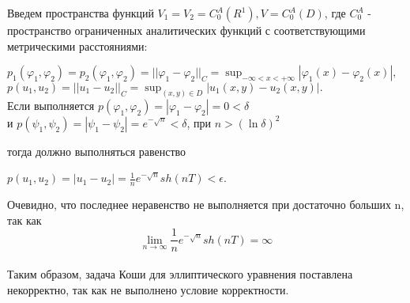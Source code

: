 \documentclass[../main.tex]{subfiles}
\begin{document}
Введем пространства функций $V_1=V_2=C_0^A(R^1), V=C_0^A(D)$, где $C_0^A$ - пространство ограниченных аналитических функций с соответствующими метрическими расстояниями:
\begin{center}
	$p_1(\varphi_1,\varphi_2)=p_2(\varphi_1, \varphi_2) =||\varphi_1-\varphi_2||_C = \sup_{-\infty<x<+\infty}|\varphi_1(x)-\varphi_2(x)|, $\\
	$ $\\
	$p(u_1, u_2)=||u_1-u_2||_C=\sup_{(x,y) \in D}|u_1(x,y)-u_2(x,y)|.$\\
	$ $\\
	Если выполняется $p(\varphi_1,\varphi_2)=|\varphi_1-\varphi_2|=0<\delta$\\
	$ $\\
	и $p(\psi_1,\psi_2)=|\psi_1-\psi_2|=e^{-\sqrt{n}}<\delta$, при $n>(\ln{\delta})^2$
\end{center}

тогда должно выполняться равенство

\begin{center}
	$p(u_1,u_2)=|u_1-u_2|=\frac{1}{n}e^{-\sqrt{n}}sh(nT)<\epsilon$.
\end{center}

Очевидно, что последнее неравенство не выполняется при достаточно больших n, так как \[\lim_{n \to \infty}{\frac{1}{n}}e^{-\sqrt{n}}sh(nT)=\infty\]\\

Таким образом, задача Коши для эллиптического уравнения поставлена некорректно, так как не выполнено условие корректности.
\end{document}
